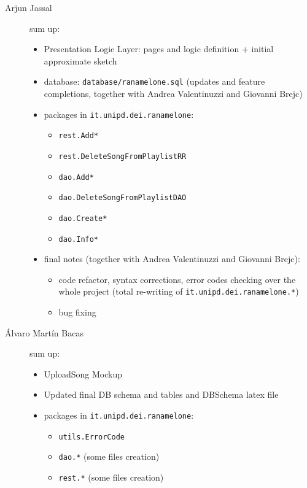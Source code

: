 \begin{description}
    \item[Arjun Jassal] sum up:
    \begin{itemize}
        \item Presentation Logic Layer: pages and logic definition + initial approximate sketch
        \item database: \verb|database/ranamelone.sql| (updates and feature completions, together with Andrea Valentinuzzi and Giovanni Brejc)
        \item packages in \verb|it.unipd.dei.ranamelone|:
        \begin{itemize}
            \item \verb|rest.Add*|
            \item \verb|rest.DeleteSongFromPlaylistRR|
            \item \verb|dao.Add*|
            \item \verb|dao.DeleteSongFromPlaylistDAO|
            \item \verb|dao.Create*|
            \item \verb|dao.Info*|
        \end{itemize}
        \item final notes (together with Andrea Valentinuzzi and Giovanni Brejc):
        \begin{itemize}
            \item code refactor, syntax corrections, error codes checking over the whole project (total re-writing of \verb|it.unipd.dei.ranamelone.*|)
            \item bug fixing
        \end{itemize}
    \end{itemize}
    
    \item[Álvaro Martín Bacas] sum up:
    \begin{itemize}
        \item UploadSong Mockup
        \item Updated final DB schema and tables and DBSchema latex file
        \item packages in \verb|it.unipd.dei.ranamelone|:
        \begin{itemize}
            \item \verb|utils.ErrorCode|
            \item \verb|dao.*| (some files creation)
            \item \verb|rest.*| (some files creation)
        \end{itemize}
    \end{itemize}


\end{description}
